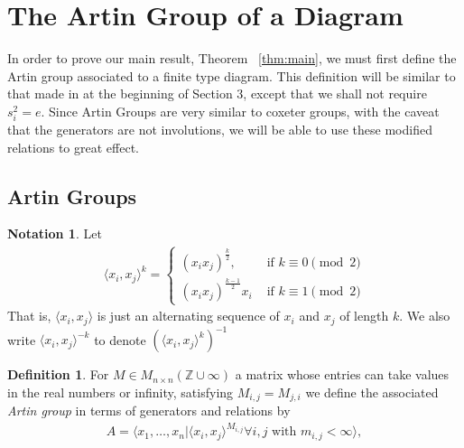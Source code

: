 \documentclass[11pt]{amsart}
\theoremstyle{definition}
\newtheorem{defn}[thm]{Definition}
\newtheorem{note}[thm]{Notation}
\begin{document}
\section{The Artin Group of a Diagram}
\label{sec:defn_artingroup}

In order to prove our main result, Theorem ~\ref{thm:main}, we must first define the Artin group associated to a finite type diagram. This definition will be similar to that made in \cite{BM13} at the beginning of Section 3, except that we shall not require $s_i^2 = e.$ Since Artin Groups are very similar to coxeter groups, with the caveat that the generators are not involutions, we will be able to use these modified relations to great effect.

\subsection{Artin Groups}

\begin{note}
Let
\begin{align*}
\langle x_i,x_j \rangle ^k = \begin{cases}
(x_ix_j)^{\frac{k}{2}}, &\text{ if }k \equiv 0 \pmod 2\\
(x_ix_j)^{\frac{k-1}{2}}x_i &\text{ if } k \equiv 1 \pmod 2
\end{cases}
\end{align*}
That is, $\langle x_i,x_j \rangle$ is just an alternating sequence of $x_i$ and $x_j$ of length $k$.  We also write $\langle x_i,x_j\rangle^{-k}$ to denote $\left(\langle x_i,x_j\rangle^k\right)^{-1}$

\end{note}
\begin{defn}
\cite[Beginning of section 1.2]{artin} 
For $M \in M_{n \times n}(\mathbb Z \cup \infty)$ a matrix whose entries can take values in the real numbers or infinity, satisfying $M_{i,j} = M_{j,i}$ we define the associated {\it Artin group} in terms of generators and relations by
\begin{align*}
A = \langle x_1,\ldots, x_n| \langle x_i,x_j \rangle^{M_{i,j}}\forall i,j \text{ with } m_{i,j}<\infty \rangle,
\end{align*}
\end{defn}
\end{document}
